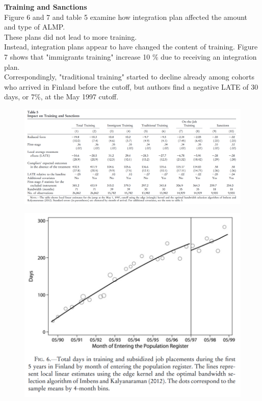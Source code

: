 \documentclass[../root]{subfiles}
\begin{document}
    {\bf Training and Sanctions} \\
    Figure 6 and 7 and table 5 examine how integration plan affected the amount and type of ALMP. \\
    These plans did not lead to more training.  \\
    Instead, integration plans appear to have changed the content of training. Figure 7 shows that "immigrants training"  increase 10 \% due to receiving an integration plan. \\
    Correspondingly, "traditional training" started to decline already among cohorts who arrived in Finland before the cutoff, but authors find a negative LATE of 30 days, or 7\%, at the May 1997 cutoff. 
  \begin{figure}[h]
        \includegraphics[width=15cm]{0703sugiyama/Table5.png}
    \end{figure}
    \begin{figure}[h]
        \includegraphics[width=12cm]{0703sugiyama/Figure6.png}
    \end{figure}
\end{document}

